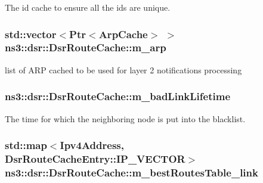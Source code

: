 The id cache to ensure all the ids are unique. 

\subsubsection[{\texorpdfstring{m\+\_\+arp}{m_arp}}]{\setlength{\rightskip}{0pt plus 5cm}std\+::vector$<${\bf Ptr}$<${\bf Arp\+Cache}$>$ $>$ ns3\+::dsr\+::\+Dsr\+Route\+Cache\+::m\+\_\+arp}\hypertarget{classns3_1_1dsr_1_1DsrRouteCache_a7e39c179e1fb9968ff73c11eac4a4605}{}\label{classns3_1_1dsr_1_1DsrRouteCache_a7e39c179e1fb9968ff73c11eac4a4605}


list of A\+RP cached to be used for layer 2 notifications processing 

\subsubsection[{\texorpdfstring{m\+\_\+bad\+Link\+Lifetime}{m_badLinkLifetime}}]{ ns3\+::dsr\+::\+Dsr\+Route\+Cache\+::m\+\_\+bad\+Link\+Lifetime\hspace{0.3cm}{\ttfamily [private]}}\hypertarget{classns3_1_1dsr_1_1DsrRouteCache_a7ab3daa7c72f3320d4eb70742a4c819d}{}\label{classns3_1_1dsr_1_1DsrRouteCache_a7ab3daa7c72f3320d4eb70742a4c819d}


The time for which the neighboring node is put into the blacklist. 

\subsubsection[{\texorpdfstring{m\+\_\+best\+Routes\+Table\+\_\+link}{m_bestRoutesTable_link}}]{\setlength{\rightskip}{0pt plus 5cm}std\+::map$<${\bf Ipv4\+Address}, {\bf Dsr\+Route\+Cache\+Entry\+::\+I\+P\+\_\+\+V\+E\+C\+T\+OR}$>$ ns3\+::dsr\+::\+Dsr\+Route\+Cache\+::m\+\_\+best\+Routes\+Table\+\_\+link\hspace{0.3cm}{\ttfamily [private]}}\hypertarget{classns3_1_1dsr_1_1DsrRouteCache_aeff05d869cb32e13605d4792a0a0d841}{}\label{classns3_1_1dsr_1_1DsrRouteCache_aeff05d869cb32e13605d4792a0a0d841}


